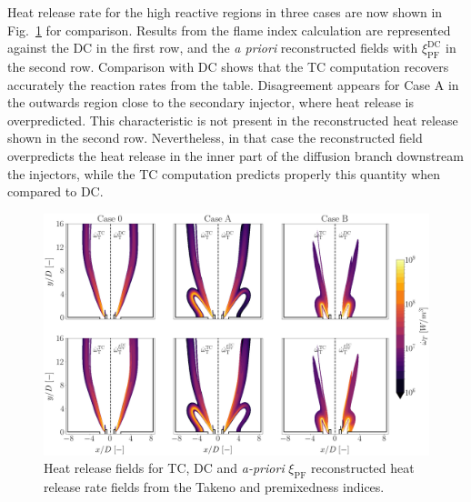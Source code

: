 \documentclass[preprint,12pt,authoryear]{elsarticle}
\begin{document}
{Heat release rate for the high reactive regions in three cases are now shown in Fig.~\ref{fig:fts_maps_a_posteriori_HRR} for comparison. Results from the flame index calculation 
are represented against the DC in the first row, and 
the \textsl{a priori} reconstructed fields with $\xi_\mathrm{PF}^\mathrm{DC}$ in the second row. Comparison with DC shows that the TC computation recovers accurately the reaction rates from the table. Disagreement appears for Case A in the outwards region close to the secondary injector, where heat release is overpredicted. This characteristic is not present in the reconstructed heat release shown in the second row. Nevertheless, in that case the reconstructed field overpredicts the heat release in the inner part of the diffusion branch downstream the injectors, while the TC computation predicts properly this quantity when compared to DC. 


\begin{figure}[t!]
        \centering
	\includegraphics[scale=0.22]{./figures/fts_maps_a_posteriori_HRR_2rows}
	\caption{Heat release fields for TC, DC and \textsl{a-priori}  $\xi_\mathrm{PF}$ reconstructed heat release rate fields from the Takeno and premixedness indices. }
	\label{fig:fts_maps_a_posteriori_HRR}
\end{figure}

}
\end{document}
